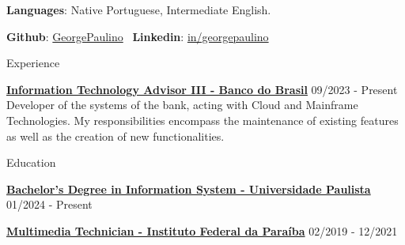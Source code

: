 \documentclass{resume}
\begin{document}
\textbf{Languages}: Native Portuguese, Intermediate English.

\textbf{Github}: \href{https://github.com/GeorgePaulino}{GeorgePaulino} \ 
\textbf{Linkedin}:  \href{https://www.linkedin.com/in/georgepaulino/}{in/georgepaulino}



\begin{rSection}{Experience}
    \item \textbf{\href{https://www.bb.com.br/site/}{Information Technology Advisor III - Banco do Brasil}} \hfill 09/2023 - Present \\
    Developer of the systems of the bank, acting with Cloud and Mainframe Technologies. My responsibilities encompass the maintenance of existing features as well as the creation of new functionalities.
\end{rSection} 


\begin{rSection}{Education}
    \item \textbf{\href{https://www.ufpb.br/}{Bachelor's Degree in Information System - Universidade Paulista}} \hfill {01/2024 - Present}
    \item \textbf{\href{https://www.ifpb.edu.br/}{Multimedia Technician - Instituto Federal da Paraíba}} \hfill {02/2019 - 12/2021}
\end{rSection}


\end{document}
